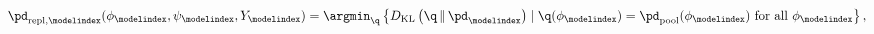\begin{equation}
  \pd_{\text{repl}, \modelindex}(\phi_{\modelindex}, \psi_{\modelindex}, Y_{\modelindex}) =
  \argmin_{\q} \left\{
    D_{\mathrm{KL}}\left(\q \, \| \, \pd_{\modelindex}\right) \mid \q(\phi_{\modelindex}) = \pd_{\text{pool}}(\phi_{\modelindex}) \text { for all } \phi_{\modelindex}
  \right\},
  \label{eqn:chained-marginal-replacement-kl}
\end{equation}